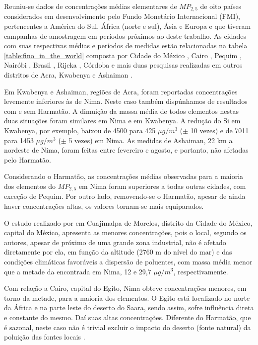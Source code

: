 Reuniu-se dados de concentrações médias elementares de $MP_{2,5}$ de oito 
países considerados em desenvolvimento pelo Fundo Monetário Internacional (FMI),
pertencentes a América do Sul, África (norte e sul), Ásia e Europa e que tiveram
campanhas de amostragem em períodos próximos ao deste trabalho. As cidades
com suas respectivas médias e períodos de medidas estão relacionadas na 
tabela \ref{table:fino_in_the_world} composta por  
Cidade do México \citep{diaz2014},
Cairo  \citep{boman2013},
Pequim  \citep{yang2011},
Nairóbi   \citep{gaita2014},
Brasil \citep{andrade2012urban},
Rijeka  \citep{ivovsevic2015}, 
Córdoba  \citep{achad2014} e mais duas pesquisas realizadas em 
outros distritos de Acra, Kwabenya \citep{aboh2009} e Ashaiman \citep{ofosu2012}. 

Em Kwabenya e Ashaiman, regiões de Acra, foram reportadas concentrações 
levemente inferiores às de Nima. Neste caso também dispúnhamos de resultados 
com e sem Harmatão. A dimuição da massa média de todos elementos nestas duas 
situações foram similares em Nima e em Kwabenya. A redução do Si em Kwabenya, 
por exemplo, baixou de 4500 para 425 $\mu g/m^3$ 
($\pm$ 10 vezes) e de 7011 para 1453 $\mu g/m^3$ ($\pm$ 5 vezes) em Nima. 
As medidas de Ashaiman, 22 km a nordeste de Nima, foram feitas entre 
fevereiro e agosto, e portanto, não afetadas pelo Harmatão.

Considerando o Harmatão, as concentrações médias observadas para a maioria dos 
elementos do $MP_{2,5}$ em Nima foram superiores a todas outras cidades, com 
exceção de Pequim. Por outro lado, removendo-se o Harmatão, apesar de ainda 
haver concentrações altas, os valores tornam-se mais equiparados. 

O estudo realizado por \citet{diaz2014} em Cuajimalpa de Morelos, distrito 
da Cidade do México, capital do México, apresenta as menores concentrações, 
pois o local, segundo os autores, apesar de próximo de uma grande zona industrial, 
não é afetado diretamente por ela, em função da altitude (2760 m do nível do mar)
e das condições climáticas favoráveis a dispersão de poluentes, com massa média 
menor que a metade da encontrada em Nima, 12 e 29,7 $\mu g/m^3$, respectivamente.

Com relação a Cairo, capital do Egito, Nima obteve concentrações menores, 
em torno da metade, para a maioria dos elementos. O Egito está localizado 
no norte da África e na parte leste do deserto do Saara, sendo assim,
sofre influência direta e constante do mesmo. Daí suas altas concentrações. 
Diferente do Harmatão, que é sazonal, neste caso não é trivial excluir o impacto 
do deserto (fonte natural) da poluição das fontes locais \citet{boman2013}.

